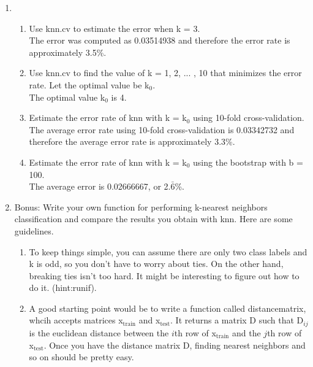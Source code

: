 \documentclass[11pt]{article}
\begin{document}
\begin{enumerate}
\item 
\begin{enumerate}

\item Use knn.cv to estimate the error when k = 3. \\

The error was computed as 0.03514938 and therefore the error rate is 
approximately 3.5\%.

\item Use knn.cv to find the value of k = 1, 2, ... , 10 that 
 minimizes the error rate. Let the optimal value be k$_0$.\\

The optimal value k$_0$ is 4.

\item Estimate the error rate of knn with k = k$_0$ using 10-fold
 cross-validation.\\

The average error rate using 10-fold cross-validation is 0.03342732
and therefore the average error rate is approximately 3.3\%.

\item Estimate the error rate of knn with k = k$_0$ using the 
 bootstrap with b = 100.\\

The average error is 0.02666667, or 2.$\bar6$\%.

\end{enumerate}

\item Bonus: Write your own function for performing k-nearest 
 neighbors classification and compare the results you obtain 
 with knn. Here are some guidelines. 
\begin{enumerate}

\item To keep things simple, you can assume there are only two 
 class labels and k is odd, so you don't have to worry about 
 ties. On the other hand, breaking ties isn't too hard. It 
 might be interesting to figure out how to do it. (hint:runif).

\item A good starting point would be to write a function called 
 distancematrix, whcih accepts matrices x$_\text{train}$ and x$_\text{test}$. 
 It returns a matrix D such that D$_{ij}$ is the euclidean 
 distance between the $i$th row of x$_\text{train}$ and the $j$th row of 
 x$_\text{test}$. Once you have the distance matrix D, finding nearest
 neighbors and so on should be pretty easy.


\end{enumerate}
\end{enumerate}
\end{document}
